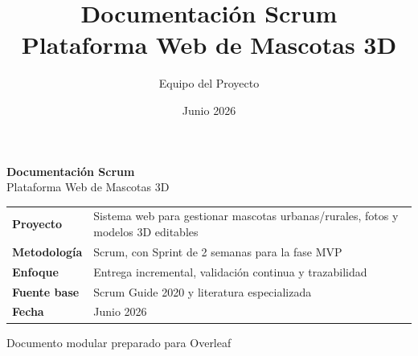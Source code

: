 \documentclass[12pt,a4paper]{article}
\title{\Huge\textbf{Documentaci\'on Scrum}\\[0.3em]\Large Plataforma Web de Mascotas 3D}
\author{Equipo del Proyecto}
\date{Junio 2026}
\begin{document}
\begin{titlepage}
\centering
\vspace*{1.8cm}
{\Huge\bfseries\color{PrimaryBlue} Documentaci\'on Scrum\\[0.35em]}
{\LARGE Plataforma Web de Mascotas 3D\\[1.2cm]}

\begin{tabular}{p{5cm} p{8cm}}
\rowcolor{SoftGray}
\textbf{Proyecto} & Sistema web para gestionar mascotas urbanas/rurales, fotos y modelos 3D editables \\
\textbf{Metodolog\'ia} & Scrum, con Sprint de 2 semanas para la fase MVP \\
\textbf{Enfoque} & Entrega incremental, validaci\'on continua y trazabilidad \\
\textbf{Fuente base} & Scrum Guide 2020 y literatura especializada \\
\textbf{Fecha} & Junio 2026 \\
\end{tabular}

\vfill
{\large Documento modular preparado para Overleaf}
\end{titlepage}

\tableofcontents
\newpage








\newpage


\end{document}

